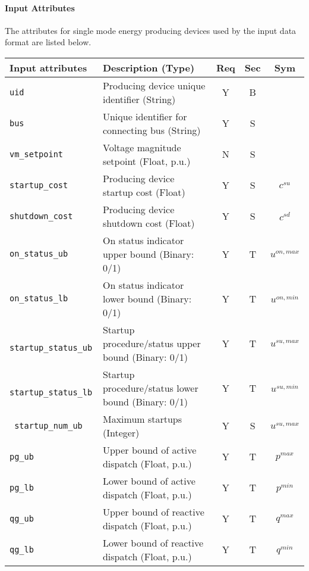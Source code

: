 \documentclass{article}
\begin{document}
\paragraph{Input Attributes} The attributes for 
single mode energy producing devices used by the input data format are listed below.
\begin{center}
\small
\begin{tabular}{ l | l | c | c | c |}
Input attributes & Description (Type) & Req & Sec & Sym\\
\hline
  {\tt uid} & Producing device unique identifier (String) & Y & B &  \\
  {\tt bus} & Unique identifier for connecting bus (String)& Y & S & \\
  {\tt vm\_setpoint} & Voltage magnitude setpoint (Float, p.u.) & N & S & \\
  {\tt startup\_cost} & Producing device startup cost (Float) & Y & S & $c^{su}$\\
  {\tt shutdown\_cost} & Producing device shutdown cost (Float) & Y & S & $c^{sd}$\\  
  {\tt on\_status\_ub} & On status indicator upper bound (Binary: 0/1) & Y & T & $u^{on,max}$\\
  {\tt on\_status\_lb} & On status indicator lower bound (Binary: 0/1) & Y & T & $u^{on,min}$\\
  {\tt\color{red} startup\_status\_ub} & Startup procedure/status upper bound (Binary: 0/1) & Y & T & $u^{su,max}$\\
  {\tt\color{red} startup\_status\_lb} & Startup procedure/status lower bound (Binary: 0/1) & Y & T & $u^{su,min}$\\
  {\tt\color{red} startup\_num\_ub} & Maximum startups (Integer) & Y & S & $u^{su,max}$\\  
  {\tt pg\_ub} & Upper bound of active dispatch (Float, p.u.) & Y & T & $p^{max}$ \\
  {\tt pg\_lb} & Lower bound of active dispatch (Float, p.u.) & Y & T & $p^{min}$ \\
  {\tt qg\_ub} & Upper bound of reactive dispatch (Float, p.u.)& Y & T & $q^{max}$\\
  {\tt qg\_lb} & Lower bound of reactive dispatch (Float, p.u.)& Y & T & $q^{min}$\\ 


\end{tabular}
\end{center}
\end{document}
